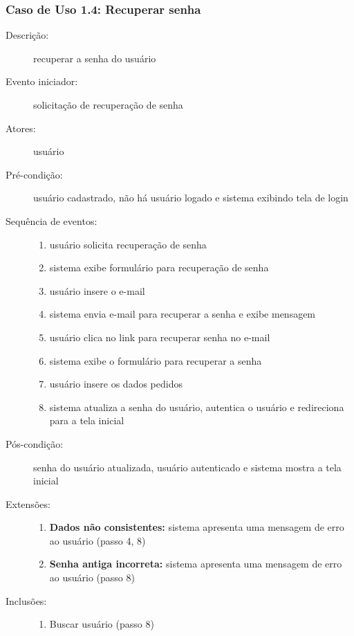 \subsubsection{Caso de Uso 1.4: Recuperar senha}
\begin{description}
	\item[Descrição:] recuperar a senha do usuário
	\item[Evento iniciador:] solicitação de recuperação de senha
	\item[Atores:] usuário
	\item[Pré-condição:] usuário cadastrado, não há usuário logado e sistema exibindo tela de login
	\item[Sequência de eventos:] \hfill
		\begin{enumerate}
			\item{usuário solicita recuperação de senha}
			\item{sistema exibe formulário para recuperação de senha}
			\item{usuário insere o e-mail}
			\item{sistema envia e-mail para recuperar a senha e exibe mensagem}
			\item{usuário clica no link para recuperar senha no e-mail}
			\item{sistema exibe o formulário para recuperar a senha}
			\item{usuário insere os dados pedidos}
			\item{sistema atualiza a senha do usuário, autentica o usuário e redireciona para a tela inicial}
		\end{enumerate}
	\item[Pós-condição:] senha do usuário atualizada, usuário autenticado e sistema mostra a tela inicial
	\item[Extensões:] \hfill
		\begin{enumerate}
			\item{\textbf{Dados não consistentes:} sistema apresenta uma mensagem de erro ao usuário (passo 4, 8)}
			\item{\textbf{Senha antiga incorreta:} sistema apresenta uma mensagem de erro ao usuário (passo 8)}
		\end{enumerate}
	\item[Inclusões:] \hfill
		\begin{enumerate}
			\item{Buscar usuário (passo 8)}
		\end{enumerate}
\end{description}
